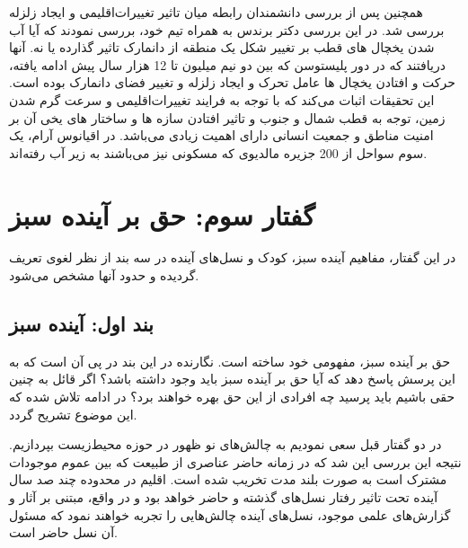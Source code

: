 \begin{enumerate}
همچنین پس از بررسی دانشمندان رابطه میان تاثیر تغییرات‌اقلیمی و ایجاد زلزله بررسی شد. در این بررسی دکتر برندس به همراه تیم خود، بررسی نمودند که آیا آب شدن یخچال های قطب بر تغییر شکل یک منطقه از دانمارک تاثیر گذارده یا نه. آنها دریافتند که در دور پلیستوسن که بین دو نیم میلیون  تا 12 هزار سال پیش ادامه یافته، حرکت و افتادن یخچال ها عامل تحرک و ایجاد زلزله و تغییر فضای دانمارک  بوده است. این تحقیقات اثبات می‌کند که با توجه به فرایند تغییرات‌اقلیمی و سرعت گرم شدن زمین، توجه به  قطب شمال و جنوب و تاثیر افتادن سازه ها و ساختار های یخی آن بر امنیت مناطق و جمعیت انسانی دارای اهمیت زیادی می‌باشد. 
	در اقیانوس آرام، یک سوم سواحل از 200 جزیره مالدیوی که مسکونی نیز می‌باشند به زیر آب رفته‌اند.
	
	
\end{enumerate}


\section*{گفتار سوم: حق بر آینده سبز}
در این گفتار، مفاهیم آینده سبز، کودک و نسل‌های آینده در سه بند از نظر لغوی تعریف گردیده و حدود آنها مشخص می‌شود. 

	\subsection*{بند اول: آینده سبز}


حق بر آینده سبز، مفهومی خود ساخته است. نگارنده در این بند در پی آن است که به این پرسش پاسخ دهد که آیا حق بر آینده سبز باید وجود داشته باشد؟ اگر قائل به چنین حقی باشیم باید پرسید چه افرادی از این حق بهره خواهند برد؟ در ادامه تلاش شده که این موضوع تشریح گردد. 

در دو گفتار قبل سعی نمودیم به چالش‌های نو ظهور در حوزه محیط‌زیست بپردازیم. نتیجه این بررسی این شد که در زمانه حاضر عناصری از طبیعت که بین عموم موجودات مشترک است به صورت بلند مدت تخریب شده است. اقلیم در محدوده چند صد سال آینده تحت تاثیر رفتار نسل‌های گذشته و حاضر خواهد بود و در واقع، مبتنی بر آثار و گزارش‌های علمی موجود، نسل‌های آینده چالش‌هایی را تجربه خواهند نمود که مسئول آن نسل حاضر است. 

